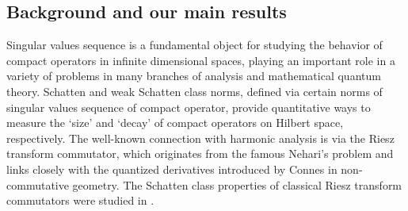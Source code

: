 \documentclass[12pt]{amsart}
\begin{document}
\subsection{Background and our main results}
Singular values sequence is a fundamental object for studying the behavior of compact operators in infinite dimensional spaces, playing an important role in a variety of problems in many branches of analysis and mathematical quantum theory. Schatten and weak Schatten class norms, defined via certain norms of singular values sequence of compact operator, provide quantitative ways to measure the `size' and `decay' of compact operators on Hilbert space, respectively.
%
%
The well-known connection with harmonic analysis is via the Riesz transform commutator, which  originates from the famous Nehari's \cite{Ne} problem and links closely with the quantized derivatives introduced by Connes \cite[IV]{Connes} in non-commutative geometry.
The Schatten class properties of classical Riesz transform commutators were studied in \cite{JW,RS1988,RS}.

\end{document}

